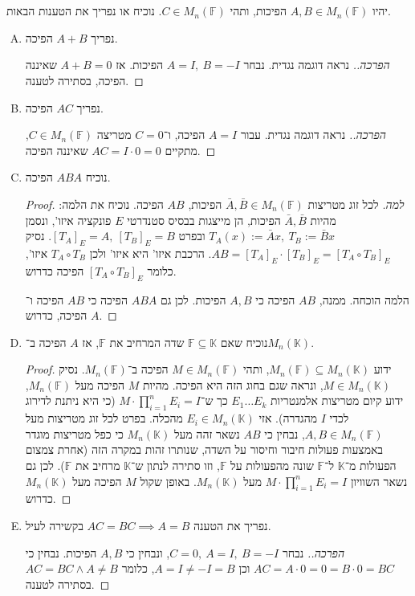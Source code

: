 \documentclass[]{article}
\newcommand\F         {\mathbb{F}}
\newcommand\K         {\mathbb{K}}
\theoremstyle{definition}
\begin{document}
    \section{}
    יהיו $A, B \in M_n(\F)$ הפיכות, ותהי $C \in M_n(\F)$. נוכיח או נפריך את הטענות הבאות. 
    \begin{enumerate}[(A)]
        \item נפריך $A + B$ הפיכה. \begin{proof}[הפרכה.]
            נראה דוגמה נגדית. נבחר $A = I, \ B = -I$ הפיכות. אז $A + B = 0$ שאיננה הפיכה, בסתירה לטענה. 
        \end{proof}
        \item נפריך $AC$ הפיכה. \begin{proof}[הפרכה.]
            נראה דוגמה נגדית. עבור $A = I$ הפיכה, ו־$C = 0$ מטריצה $C \in M_n(\F)$, מתקיים $AC = I \cdot 0 = 0$ שאיננה הפיכה. 
        \end{proof}
        \item נוכיח $ABA$ הפיכה. \begin{proof}
            \textit{למה. }לכל זוג מטריצות $\bar A, \bar B \in M_n(\F)$ הפיכות, $AB$ הפיכה. נוכיח את הלמה: מהיות $\bar A, \bar B$ הפיכות, הן מייצגות בבסיס סטנדרטי $E$ פונקציה איזו', ונסמן $T_A(x) := \bar Ax, \ T_B := \bar Bx$ ובפרט $[T_A]_E = A, \ [T_B]_E = B$. נסיק $AB = [T_A]_E \cdot [T_B]_E = [T_A \circ T_B]_E$. הרכבת איזו' היא איזו' ולכן $T_A \circ T_B$ איזו', כלומר $[T_A \circ T_B]_E$ הפיכה כדרוש. 
            
            הלמה הוכחה. ממנה, $AB$ הפיכה כי $A, B$ הפיכות. לכן גם $ABA$ הפיכה כי $AB$ הפיכה ו־$A$ הפיכה, כדרוש. 
        \end{proof}
        \item נוכיח שאם $\F \subseteq \K$ שדה המרחיב את $\F$, אז $A$ הפיכה ב־$M_n(\K)$. \begin{proof}
            ידוע $M_n(\F) \subseteq M_n(\K)$, ותהי $M \in M_n(\F)$ הפיכה ב־$M_n(\F)$. נסיק $M \in M_n(\K)$, ונראה שגם בחוג הזה היא הפיכה. מהיות $M$ הפיכה מעל $M_n(\F)$, ידוע קיום מטריצות אלמנטריות $E_1 \dots E_k$ כך ש־$M \cdot \prod_{i = 1}^{n} E_i = I$ (כי היא ניתנת לדירוג לכדי $I$ מהגדרה). אזי $E_i \in M_n(\K)$ מהכלה. בפרט לכל זוג מטריצות מעל $A, B \in M_n(\F)$, נבחין כי $AB$ נשאר זהה מעל $M_n(\K)$ כי כפל מטריצות מוגדר באמצעות פעולות חיבור וחיסור על השדה, שנותרו זהות במקרה הזה (אחרת צמצום הפעולות מ־$\K$ ל־$\F$ שונה מהפעולות על $\F$, וזו סתירה לנתון ש־$\K$ מרחיב את $\F$). לכן גם נשאר השוויון $M \cdot \prod_{i = 1}^{n} E_i = I$ מעל $M_n(\K)$. באופן שקול $M$ הפיכה מעל $M_n(\K)$ כדרוש. 
        \end{proof}
        \item נפריך את הטענה $AC = BC \implies A = B$ בקשירה לעיל. \begin{proof}[הפרכה.]
            נבחר $C = 0, \ A = I, \ B = -I$, ונבחין כי $A, B$ הפיכות. נבחין כי $AC = A \cdot 0 = 0 = B \cdot 0 = BC$ וכן $A = I \neq -I = B$, כלומר $AC = BC \land A \neq B$ בסתירה לטענה. 
        \end{proof}
    \end{enumerate}
    
\end{document}
